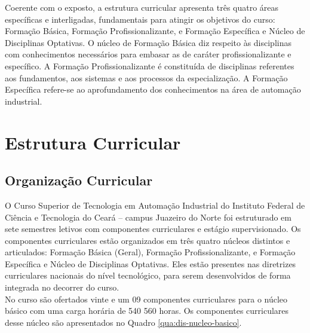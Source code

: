 Coerente com o exposto, a estrutura curricular apresenta três quatro áreas específicas e interligadas, fundamentais para atingir os objetivos do curso: Formação Básica, Formação Profissionalizante, e Formação Específica e Núcleo de Disciplinas Optativas. O núcleo de Formação Básica diz respeito às disciplinas com conhecimentos necessários para embasar as de caráter profissionalizante e específico. A Formação Profissionalizante é constituída de disciplinas referentes aos fundamentos, aos sistemas e aos processos da especialização. A Formação Específica refere-se ao aprofundamento dos conhecimentos na área de automação industrial.\\

\chapter{Estrutura Curricular}

\section{Organização Curricular}

O Curso Superior de Tecnologia em Automação Industrial do Instituto Federal de Ciência e Tecnologia do Ceará – campus Juazeiro do Norte foi estruturado em sete semestres letivos com componentes curriculares e estágio supervisionado. Os componentes curriculares estão organizados em três quatro núcleos distintos e articulados: Formação Básica (Geral), Formação Profissionalizante, e Formação Específica e Núcleo de Disciplinas Optativas. Eles estão presentes nas diretrizes curriculares nacionais do nível tecnológico, para serem desenvolvidos de forma integrada no decorrer do curso.\\

No curso são ofertados vinte e um 09 componentes curriculares para o núcleo básico com uma carga horária de 540 560 horas. Os componentes curriculares desse núcleo são apresentados no Quadro \ref{qua:dis-nucleo-basico}.\\

